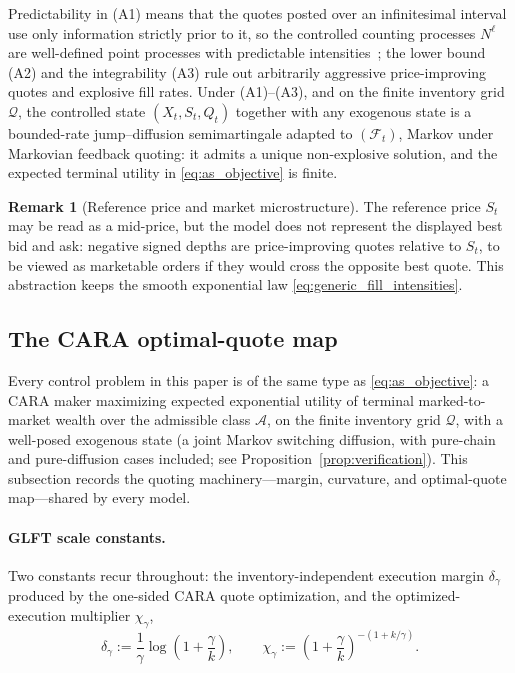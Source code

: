 \documentclass[11pt,a4paper]{article}
\newcommand{\Qcal}{\mathcal{Q}}
\newcommand{\Acal}{\mathcal{A}}
\newcommand{\Fcal}{\mathcal{F}}
\theoremstyle{plain}
\theoremstyle{definition}
\newtheorem{remark}{Remark}[section]
\begin{document}
Predictability in \textup{(A1)} means that the quotes posted over an
infinitesimal interval use only information strictly prior to it, so the
controlled counting processes \(N^\ell\) are well-defined point processes with
predictable intensities~\cite{Bremaud1981}; the lower bound \textup{(A2)} and the integrability
\textup{(A3)} rule out arbitrarily aggressive price-improving quotes and
explosive fill rates.  Under \textup{(A1)}--\textup{(A3)}, and on the finite
inventory grid \(\Qcal\), the controlled state \((X_t,S_t,Q_t)\) together with
any exogenous state is a bounded-rate jump--diffusion semimartingale adapted to
\((\Fcal_t)\), Markov under Markovian feedback quoting: it admits a unique non-explosive solution, and the expected
terminal utility in \eqref{eq:as_objective} is finite.

\begin{remark}[Reference price and market microstructure]
The reference price \(S_t\) may be read as a mid-price, but the model does
not represent the displayed best bid and ask: negative signed depths are
price-improving quotes relative to \(S_t\), to be viewed as marketable orders
if they would cross the opposite best quote.  This abstraction keeps the
smooth exponential law \eqref{eq:generic_fill_intensities}.
\end{remark}

\subsection{The CARA optimal-quote map}
\label{subsec:quote_map}

Every control problem in this paper is of the same type as
\eqref{eq:as_objective}: a CARA maker maximizing expected exponential utility
of terminal marked-to-market wealth over the admissible class \(\Acal\), on
the finite inventory grid \(\Qcal\), with a well-posed exogenous state (a
joint Markov switching diffusion, with pure-chain and pure-diffusion cases
included; see
Proposition~\ref{prop:verification}).  This subsection records the quoting
machinery---margin, curvature, and optimal-quote map---shared by every model.

\paragraph{GLFT scale constants.}
Two constants recur throughout: the inventory-independent execution margin
\(\delta_\gamma\) produced by the one-sided CARA quote optimization, and the
optimized-execution multiplier \(\chi_\gamma\),
\begin{equation}
\delta_\gamma
:=\frac1\gamma\log\left(1+\frac{\gamma}{k}\right),
\qquad
\chi_\gamma
:=\left(1+\frac{\gamma}{k}\right)^{-(1+k/\gamma)}.
\label{eq:delta_gamma}
\end{equation}
\end{document}
